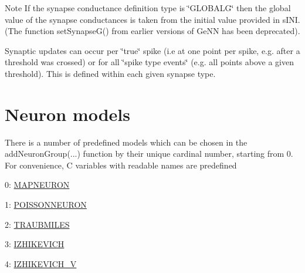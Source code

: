 \begin{DoxyNote}{Note}
If the synapse conductance definition type is \char`\"{}\+G\+L\+O\+B\+A\+L\+G\char`\"{} then the global value of the synapse conductances is taken from the initial value provided in {\ttfamily s\+I\+N\+I}. (The function set\+Synapse\+G() from earlier versions of Ge\+N\+N has been deprecated).
\end{DoxyNote}
Synaptic updates can occur per \char`\"{}true\char`\"{} spike (i.\+e at one point per spike, e.\+g. after a threshold was crossed) or for all \char`\"{}spike type events\char`\"{} (e.\+g. all points above a given threshold). This is defined within each given synapse type. \hypertarget{sect2}{}\section{Neuron models}\label{sect2}
There is a number of predefined models which can be chosen in the {\ttfamily add\+Neuron\+Group}(...) function by their unique cardinal number, starting from 0. For convenience, C variables with readable names are predefined
\begin{DoxyItemize}
\item 0\+: \hyperlink{sect2_sect21}{M\+A\+P\+N\+E\+U\+R\+O\+N}
\item 1\+: \hyperlink{sect2_sect22}{P\+O\+I\+S\+S\+O\+N\+N\+E\+U\+R\+O\+N}
\item 2\+: \hyperlink{sect2_sect23}{T\+R\+A\+U\+B\+M\+I\+L\+E\+S}
\item 3\+: \hyperlink{sect2_sect24}{I\+Z\+H\+I\+K\+E\+V\+I\+C\+H}
\item 4\+: \hyperlink{sect2_sect25}{I\+Z\+H\+I\+K\+E\+V\+I\+C\+H\+\_\+\+V}
\end{DoxyItemize}

